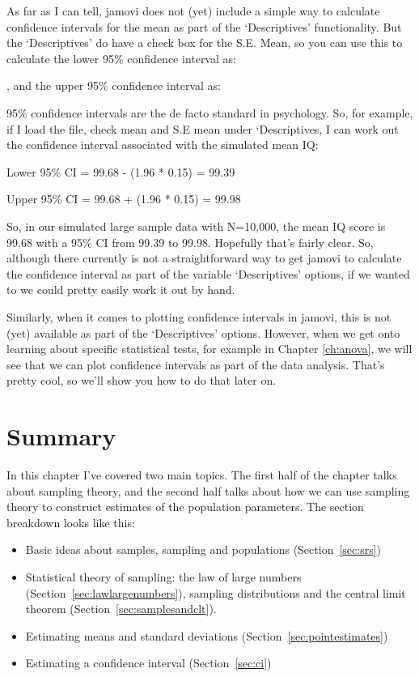 As far as I can tell, jamovi does not (yet) include a simple way to  calculate confidence intervals for the mean as part of the `Descriptives' functionality. But the `Descriptives' do have a check box for the S.E. Mean, so you can use this to calculate the lower 95\% confidence interval as:

 , and the upper 95\% confidence interval as:


95\% confidence intervals are the de facto standard in psychology. So, for example, if I load the  file, check mean and S.E mean under `Descriptives, I can work out the confidence interval associated with the simulated mean IQ: 

Lower 95\% CI = 99.68 - (1.96 * 0.15) = 99.39

Upper 95\% CI = 99.68 + (1.96 * 0.15) = 99.98 

So, in our simulated large sample data with N=10,000, the mean IQ score is 99.68 with a 95\% CI from 99.39 to 99.98. Hopefully that's fairly clear. So, although there currently is not a straightforward way to get jamovi to calculate the confidence interval as part of the variable `Descriptives' options, if we wanted to we could pretty easily work it out by hand. 

Similarly, when it comes to plotting confidence intervals in jamovi, this is not (yet) available as part of the `Descriptives' options. However, when we get onto learning about specific statistical tests, for example in Chapter  \ref{ch:anova}, we will see that we can plot confidence intervals as part of the data analysis. That's pretty cool, so we'll show you how to do that later on.


\section{Summary}

In this chapter I've covered two main topics. The first half of the chapter talks about sampling theory, and the second half talks about how we can use sampling theory to construct estimates of the population parameters. The section breakdown looks like this:

\begin{itemize} \itemsep -2pt
\item Basic ideas about samples, sampling and populations (Section~\ref{sec:srs})
\item Statistical theory of sampling: the law of large numbers (Section~\ref{sec:lawlargenumbers}), sampling distributions and the central limit theorem (Section~\ref{sec:samplesandclt}).
\item Estimating means and standard deviations (Section~\ref{sec:pointestimates})
\item Estimating a confidence interval (Section~\ref{sec:ci})
\end{itemize}

